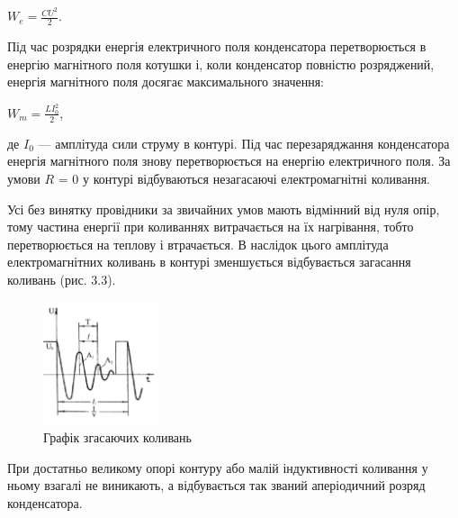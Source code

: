 \documentclass[12pt,a4paper]{article}
\begin{document}
    \begin{center}
        $\displaystyle W_e = \frac{CU^2}{2}.$
    \end{center}

    Під час розрядки енергія електричного поля конденсатора перетворюється в енергію магнітного поля котушки і,
    коли конденсатор повністю розряджений, енергія магнітного поля досягає максимального значення:

    \begin{center}
        $\displaystyle W_m = \frac{LI_0^2}{2}$,
    \end{center}

    де $I_0$ --- амплітуда сили струму в контурі. Під час перезаряджання конденсатора енергія магнітного поля знову перетворюється на енергію електричного поля.
    За умови $R$ = 0 у контурі відбуваються незагасаючі електромагнітні коливання.

    Усі без винятку провідники за звичайних умов мають відмінний від нуля опір, тому частина енергії при
    коливаннях витрачається на їх нагрівання, тобто перетворюється на теплову і втрачається.
    В наслідок цього амплітуда електромагнітних коливань в контурі зменшується
    відбувається загасання коливань (рис. 3.3).

    \begin{figure}[h!]

        \renewcommand{\thefigure}{3.\arabic{figure}} %

        \centering
        \includegraphics[width=0.3\textwidth]{3.3.png}
        \caption{Графік згасаючих коливань}
        \label{fig3:schema}

    \end{figure}

    При достатньо великому опорі контуру або малій індуктивності коливання у ньому взагалі не виникають,
    а відбувається так званий аперіодичний розряд конденсатора.
\end{document}
